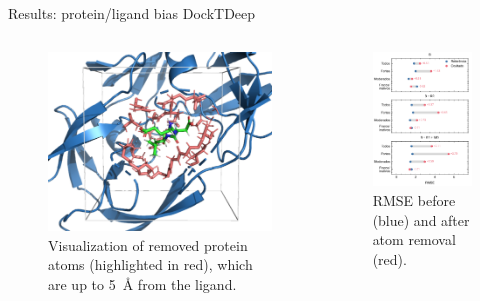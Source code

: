 \documentclass[aspectratio=169,xcolor=dvipsnames]{beamer}
\begin{document}
\begin{frame}{Results: protein/ligand bias \hfill {\footnotesize \alert{DockTDeep}}}
    \begin{columns}[c]
        \begin{figure}
            \centering
            \includegraphics[width=.8\textwidth]{imgs/results/masking.png}
            \caption{Visualization of removed protein atoms (highlighted in red), which are up to 5~\AA{} from the ligand.}
        \end{figure}

        \begin{figure}
            \centering
            \includegraphics[width=.65\textwidth]{imgs/results/masking-rmse.pdf}
            \caption{RMSE before (blue) and after atom removal (red).}
        \end{figure}
    \end{columns}
\end{frame}
\end{document}
